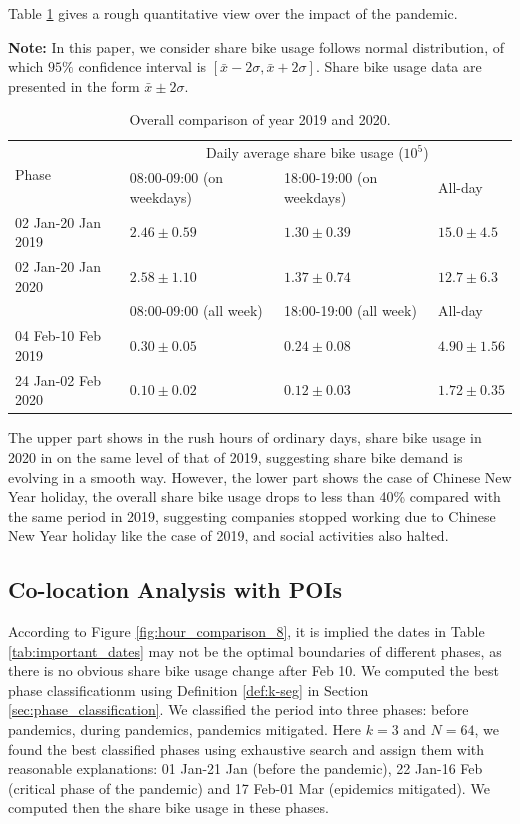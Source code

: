 \documentclass[preprints,ijgi,submit,moreauthors]{Definitions/mdpi}
\begin{document}
Table \ref{tab:overall_comparison} gives a rough quantitative view over the impact of the pandemic.

\textbf{Note:} In this paper, we consider share bike usage follows normal distribution, of which $95\%$ confidence interval is $[\bar{x}-2\sigma,\bar{x}+2\sigma]$.
Share bike usage data are presented in the form $\bar{x}\pm2\sigma$.

\begin{table}[ht]
    \centering
    \begin{tabular}{|l|l|l|l|}
        \hline
        \multirow{2}{*}{Phase} &\multicolumn{3}{c|}{Daily average share bike usage ($10^{5}$)}\\
        \cline{2-4}
        & 08:00-09:00 (on weekdays) & 18:00-19:00 (on weekdays) & All-day\\
        \hline
        02 Jan-20 Jan 2019 & $2.46\pm0.59$ & $1.30\pm0.39$ & $15.0\pm4.5$\\
        \hline
        02 Jan-20 Jan 2020 & $2.58\pm1.10$ & $1.37\pm0.74$ & $12.7\pm6.3$\\
        \hline
        \hline
        & 08:00-09:00 (all week)  & 18:00-19:00 (all week) & All-day\\
        \hline
        04 Feb-10 Feb 2019 & $0.30\pm0.05$ & $0.24\pm0.08$ & $4.90\pm1.56$\\
        \hline
        24 Jan-02 Feb 2020 & $0.10\pm0.02$ & $0.12\pm0.03$ & $1.72\pm0.35$\\
        \hline
    \end{tabular}
    \caption{Overall comparison of year 2019 and 2020.}\label{tab:overall_comparison}
\end{table}

The upper part shows in the rush hours of ordinary days, share bike usage in 2020 in on the same level of that of 2019, suggesting share bike demand is evolving in a smooth way.
However, the lower part shows the case of Chinese New Year holiday, the overall share bike usage drops to less than 40\% compared with the same period in 2019, suggesting companies stopped working due to Chinese New Year holiday like the case of 2019, and social activities also halted. 

\subsection{Co-location Analysis with POIs}\label{sec:colo-poi}

According to Figure \ref{fig:hour_comparison_8}, it is implied the dates in Table \ref{tab:important_dates} may not be the optimal boundaries of different phases, as there is no obvious share bike usage change after Feb 10.
We computed the best phase classificationm using Definition \ref{def:k-seg} in Section \ref{sec:phase_classification}.
We classified the period into three phases: before pandemics, during pandemics, pandemics mitigated.
Here $k=3$ and $N=64$, we found the best classified phases using exhaustive search and assign them with reasonable explanations: 01 Jan-21 Jan (before the pandemic), 22 Jan-16 Feb (critical phase of the pandemic) and 17 Feb-01 Mar (epidemics mitigated).
We computed then the share bike usage in these phases.
\end{document}
